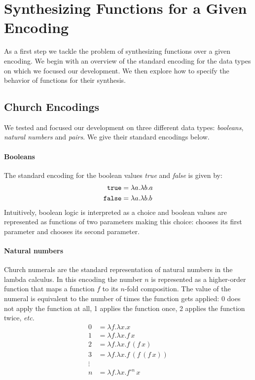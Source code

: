 \section{Synthesizing Functions for a Given Encoding} \label{sec:synthesis}
%
As a first step we tackle the problem of synthesizing
functions over a given encoding.
%
We begin with an overview of the standard encoding for the
data types on which we focused our development.
%
We then explore how to specify the behavior of functions for
their synthesis.


\subsection{Church Encodings}
%
We tested and focused our development on three
different data types: \emph{booleans}, \emph{natural
numbers} and \emph{pairs}.
%
We give their standard encodings below.

\paragraph{Booleans}
%
The standard encoding for the boolean values \emph{true} and
\emph{false} is given by:
%
\begin{align*}
  \text{\texttt{true}} &= \lambda a . \lambda b . a \\
  \text{\texttt{false}} &= \lambda a . \lambda b . b
\end{align*}
%
Intuitively, boolean logic is interpreted as a choice and
boolean values are represented as functions of two
parameters making this choice: \true chooses its first
parameter and \false chooses its second parameter.

\paragraph{Natural numbers}
%
Church numerals are the standard representation of natural
numbers in the lambda calculus.
%
In this encoding the number $n$ is represented as a
higher-order function that maps a function $f$ to its
$n$-fold composition.
%
The value of the numeral is equivalent to the number of
times the function gets applied: 0 does not apply the
function at all, 1 applies the function once, 2 applies the
function twice, \emph{etc.}
%
\begin{align*}
  0 & = \lambda f . \lambda x . x \\
  1 & = \lambda f . \lambda x . f\,x \\
  2 & = \lambda f . \lambda x . f\,(f\,x) \\
  3 & = \lambda f . \lambda x . f\,(f\,(f\,x)) \\
  \vdots & \\
  n & = \lambda f . \lambda x . f^{\circ n}\,x
\end{align*}

